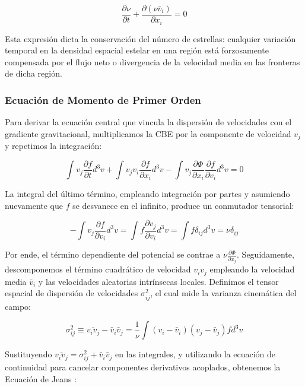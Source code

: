                 $$\frac{\partial \nu}{\partial t} + \frac{\partial (\nu 
                \bar{v}_i)}{\partial x_i} = 0$$

                Esta expresión dicta la conservación del número de estrellas: 
                cualquier variación temporal en la densidad espacial estelar en 
                una región está forzosamente compensada por el flujo neto o 
                divergencia de la velocidad media en las fronteras de dicha 
                región.

            \subsubsection{Ecuación de Momento de Primer Orden}
                Para derivar la ecuación central que vincula la dispersión de 
                velocidades con el gradiente gravitacional, multiplicamos la CBE 
                por la componente de velocidad $v_j$ y repetimos la integración:

                $$\int v_j \frac{\partial f}{\partial t} d^3v + \int v_j v_i 
                \frac{\partial f}{\partial x_i} d^3v - \int v_j \frac{\partial 
                \Phi}{\partial x_i} \frac{\partial f}{\partial v_i} d^3v = 0$$

                La integral del último término, empleando integración por partes 
                y asumiendo nuevamente que $f$ se desvanece en el infinito, 
                produce un conmutador tensorial:

                $$- \int v_j \frac{\partial f}{\partial v_i} d^3v = \int f 
                \frac{\partial v_j}{\partial v_i} d^3v = \int f \delta_{ij} d^3v 
                = \nu \delta_{ij}$$

                Por ende, el término dependiente del potencial se contrae a $\nu 
                \frac{\partial \Phi}{\partial x_j}$. Seguidamente, descomponemos 
                el término cuadrático de velocidad $v_i v_j$ empleando la 
                velocidad media $\bar{v}_i$ y las velocidades aleatorias 
                intrínsecas locales. Definimos el tensor espacial de dispersión 
                de velocidades $\sigma_{ij}^2$, el cual mide la varianza 
                cinemática del campo:

                $$\sigma_{ij}^2 \equiv \overline{v_i v_j} - \bar{v}_i \bar{v}_j 
                = \frac{1}{\nu} \int (v_i - \bar{v}_i)(v_j - \bar{v}_j) f d^3v$$

                Sustituyendo $\overline{v_i v_j} = \sigma_{ij}^2 + \bar{v}_i 
                \bar{v}_j$ en las integrales, y utilizando la ecuación de 
                continuidad para cancelar componentes derivativos acoplados, 
                obtenemos la Ecuación de Jeans \cite{binney_tremaine_2008}:

